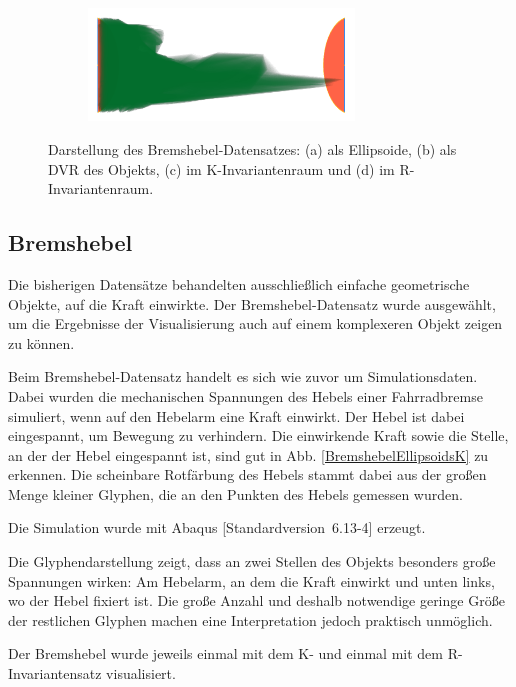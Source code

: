 \documentclass[a4paper,fontsize=12pt,toc=bib,halfparskip]{scrartcl}
\begin{document}
\begin{figure}[H]
\begin{subfigure}{0.49\textwidth}
		\centering
		\includegraphics[height=3cm]{pictures/results/Bremshebel_R_InvariantSpace.png}
		\subcaption{}
		\label{BremshebelInvariantSpaceR}
	\end{subfigure}
	\caption{Darstellung des Bremshebel-Datensatzes: (a) als Ellipsoide, (b) als DVR des Objekts, (c) im K-Invariantenraum und (d) im R-Invariantenraum.}
	\label{BremshebelK}
\end{figure}

\subsection{Bremshebel}
Die bisherigen Datens\"atze behandelten ausschlie{\ss}lich einfache geometrische Objekte, auf die Kraft einwirkte. Der Bremshebel-Datensatz wurde ausgew\"ahlt, um die Ergebnisse der Visualisierung auch auf einem komplexeren Objekt zeigen zu k\"onnen.

Beim Bremshebel-Datensatz handelt es sich wie zuvor um Simulationsdaten. Dabei wurden die mechanischen Spannungen des Hebels einer Fahrradbremse simuliert, wenn auf den Hebelarm eine Kraft einwirkt. Der Hebel ist dabei eingespannt, um Bewegung zu verhindern. Die einwirkende Kraft sowie die Stelle, an der der Hebel eingespannt ist, sind gut in Abb. \ref{BremshebelEllipsoidsK} zu erkennen. Die scheinbare Rotf\"arbung des Hebels stammt dabei aus der gro{\ss}en Menge kleiner Glyphen, die an den Punkten des Hebels gemessen wurden. 

Die Simulation wurde mit Abaqus [Standardversion~6.13-4]\cite{abaqusWebsite} erzeugt.

Die Glyphendarstellung zeigt, dass an zwei Stellen des Objekts besonders gro{\ss}e Spannungen wirken: Am Hebelarm, an dem die Kraft einwirkt und unten links, wo der Hebel fixiert ist. Die gro{\ss}e Anzahl und deshalb notwendige geringe Gr\"o{\ss}e der restlichen Glyphen machen eine Interpretation jedoch praktisch unm\"oglich.

Der Bremshebel wurde jeweils einmal mit dem K- und einmal mit dem R-Invariantensatz visualisiert. 
\end{document}
